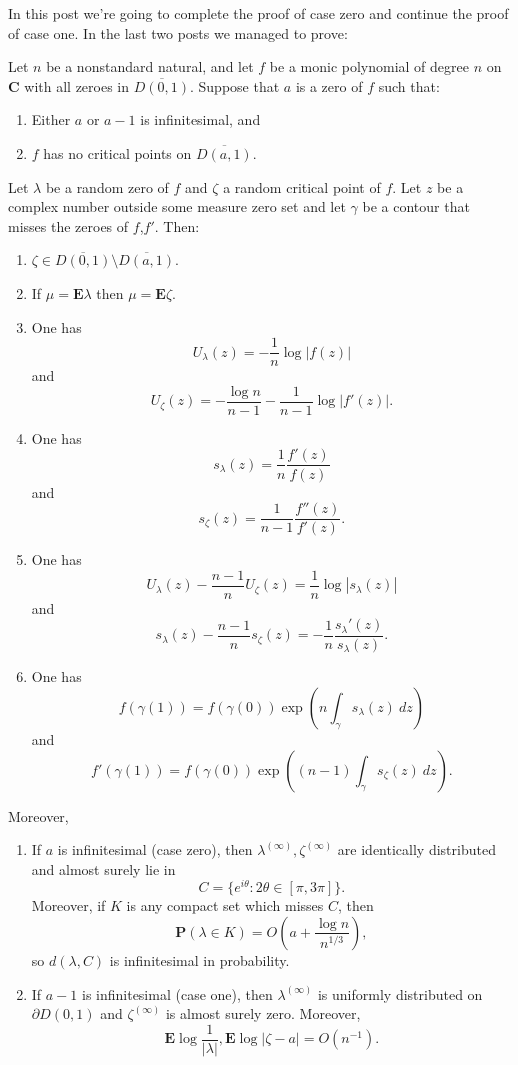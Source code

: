 \documentclass[12pt]{article}
\begin{document}

In this post we're going to complete the proof of case zero and continue the proof of case one. In the last two posts we managed to prove:

\begin{theorem}
Let $n$ be a nonstandard natural, and let $f$ be a monic polynomial of degree $n$ on $\mathbf C$ with all zeroes in $\overline{D(0, 1)}$.
Suppose that $a$ is a zero of $f$ such that:
\begin{enumerate}
\item Either $a$ or $a - 1$ is infinitesimal, and
\item $f$ has no critical points on $\overline{D(a, 1)}$.
\end{enumerate}
Let $\lambda$ be a random zero of $f$ and $\zeta$ a random critical point of $f$.
Let $z$ be a complex number outside some measure zero set and let $\gamma$ be a contour that misses the zeroes of $f$,$f'$. Then:
\begin{enumerate}
\item $\zeta \in \overline{D(0, 1)} \setminus \overline{D(a, 1)}$.
\item If $\mu = \mathbf E \lambda$ then $\mu = \mathbf E \zeta$.
\item One has
$$U_\lambda(z) = -\frac{1}{n} \log |f(z)|$$
and
$$U_\zeta(z) = -\frac{\log n}{n - 1} - \frac{1}{n-1} \log |f'(z)|.$$
\item One has
$$s_\lambda(z) = \frac{1}{n} \frac{f'(z)}{f(z)}$$
and
$$s_\zeta(z) = \frac{1}{n - 1} \frac{f''(z)}{f'(z)}.$$
\item One has
$$U_\lambda(z) - \frac{n - 1}{n} U_\zeta(z) = \frac{1}{n} \log |s_\lambda(z)|$$
and
$$s_\lambda(z) - \frac{n - 1}{n} s_\zeta(z) = -\frac{1}{n} \frac{s_\lambda'(z)}{s_\lambda(z)}.$$
\item One has
$$f(\gamma(1)) = f(\gamma(0)) \exp \left(n \int_\gamma s_\lambda(z) ~dz\right)$$
and
$$f'(\gamma(1)) = f(\gamma(0)) \exp\left((n-1) \int_\gamma s_\zeta(z) ~dz\right).$$
\end{enumerate}
Moreover,
\begin{enumerate}
\item If $a$ is infinitesimal (case zero), then $\lambda^{(\infty)},\zeta^{(\infty)}$ are identically distributed and almost surely lie in
$$C = \{e^{i\theta}: 2\theta \in [\pi, 3\pi]\}.$$
Moreover, if $K$ is any compact set which misses $C$, then
$$\mathbf P(\lambda \in K) = O\left(a + \frac{\log n}{n^{1/3}}\right),$$
so $d(\lambda, C)$ is infinitesimal in probability.
\item If $a - 1$ is infinitesimal (case one), then $\lambda^{(\infty)}$ is uniformly distributed on $\partial D(0, 1)$ and $\zeta^{(\infty)}$ is almost surely zero.
Moreover,
$$\mathbf E \log \frac{1}{|\lambda|}, \mathbf E \log |\zeta - a| = O(n^{-1}).$$
\end{enumerate}
\end{theorem}
\end{document}
